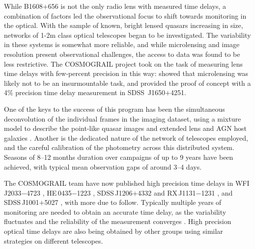While B1608$+$656 is not the only radio lens with measured time
delays, a combination of factors led the observational focus to shift
towards monitoring in the optical. With the sample of known, bright
lensed quasars increasing in size, networks of 1-2m class optical
telescopes began to be investigated. The variability in these systems
is somewhat more reliable, and while microlensing and image resolution
present observational challenges, the access to data was found to be
less restrictive. The COSMOGRAIL project \citep{Cou++05} took on the
task of measuring lens time delays with few-percent precision in this
way:
\citet{Eig++05} showed that microlensing was likely not to be an
insurmountable task, and \citet{Vui++07} provided the proof of concept
with a 4\% precision time delay measurement in SDSS\ J1650$+$4251.

One of the keys to the success of this program has been the simultaneous
deconvolution of the individual frames in the imaging dataset, using  a
mixture model to describe the point-like quasar images and extended lens
and AGN host galaxies \citep{MCS98}.  Another is the dedicated nature of
the network of telescopes employed, and the  careful calibration of the
photometry across this distributed system. Seasons of 8--12 months
duration over campaigns of up to 9 years have been achieved, with
typical mean observation gaps of around 3--4 days.

The COSMOGRAIL team have now published high precision time delays in
WFI\,J2033$-$4723 \citep[][3.8\%]{Vui++08}, HE\,0435$-$1223
\citep[][5.6\%]{Cou++11}, SDSS\,J1206$+$4332 \citep[][2.7\%]{Eul++13}
and  RX\,J1131$-$1231 \citep[][1.5\%]{Tew++13}, and SDSS\,J1001$+$5027
\citep[][2.8\%]{RK++13}, with more due to follow.  Typically multiple
years of monitoring are needed to obtain an accurate  time delay, as the
variability fluctuates and the reliability of the  measurement converges
\citep[see the discussion in e.g.\ ][]{Tew++13}. High precision optical time delays are also being obtained by other groups \citep{Poi++07a,Foh++07,Dah++15} using similar strategies on different telescopes.


